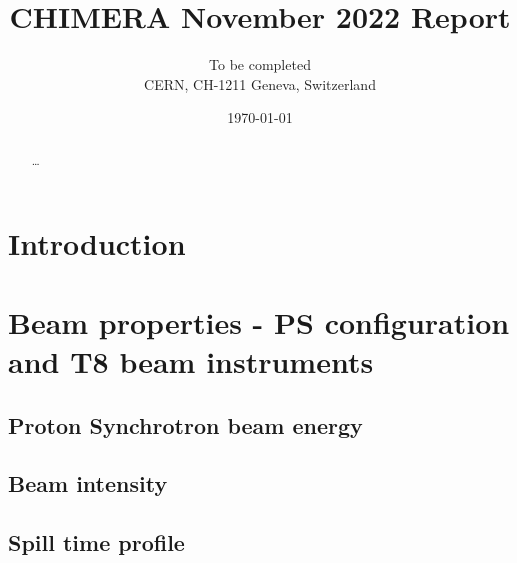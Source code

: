 \documentclass{cernatsnote}
\title{CHIMERA November 2022 Report}
\author{
    	To be completed \; \\		
    	CERN, CH-1211 Geneva, Switzerland
    }
\date{\today}
\begin{document}
    \newcommand{\figref}[1]{Fig.\,\ref{#1}}
    \newcommand{\tabref}[1]{Table\,\ref{#1}}
    \newcommand{\secref}[1]{Section\,\ref{#1}}

    \maketitle
    
    \begin{abstract}
        \ldots
    \end{abstract}

    \begingroup
    \color{black}
    \pagebreak
    \tableofcontents
    \endgroup

\pagebreak

\section{Introduction} %


\section{Beam properties - PS configuration and T8 beam instruments}

\subsection{Proton Synchrotron beam energy} %


\subsection{Beam intensity} %



\subsection{Spill time profile} %

\end{document}

